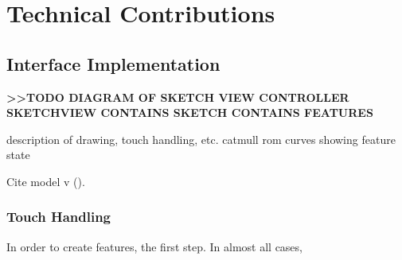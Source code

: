 \chapter{Technical Contributions}

\section{Interface Implementation}\label{interface-implementation}

\textbf{\textgreater{}\textgreater{}TODO DIAGRAM OF SKETCH VIEW
CONTROLLER SKETCHVIEW CONTAINS SKETCH CONTAINS FEATURES}

description of drawing, touch handling, etc. catmull rom curves showing
feature state

Cite model v (\citet{veit2003model}).

\subsection{Touch Handling}\label{touch-handling}

In order to create features, the first step. In almost all cases,
